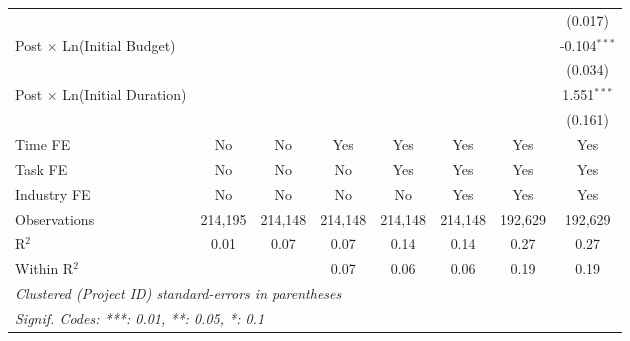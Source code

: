 \documentclass[
]{article}
\begin{document}
\begin{tabular}{lccccccc}
                                              &                &                &                &                &                &                & (0.017)\\   
   Post $\times$ Ln(Initial Budget)           &                &                &                &                &                &                & -0.104$^{***}$\\   
                                              &                &                &                &                &                &                & (0.034)\\   
   Post $\times$ Ln(Initial Duration)         &                &                &                &                &                &                & 1.551$^{***}$\\   
                                              &                &                &                &                &                &                & (0.161)\\   
   Time FE                                    & No             & No             & Yes            & Yes            & Yes            & Yes            & Yes\\  
   Task FE                                    & No             & No             & No             & Yes            & Yes            & Yes            & Yes\\  
   Industry FE                                & No             & No             & No             & No             & Yes            & Yes            & Yes\\  
   Observations                               & 214,195        & 214,148        & 214,148        & 214,148        & 214,148        & 192,629        & 192,629\\  
   R$^2$                                      & 0.01           & 0.07           & 0.07           & 0.14           & 0.14           & 0.27           & 0.27\\  
   Within R$^2$                               &                &                & 0.07           & 0.06           & 0.06           & 0.19           & 0.19\\  
   \midrule
   \multicolumn{8}{l}{\emph{Clustered (Project ID) standard-errors in parentheses}}\\
   \multicolumn{8}{l}{\emph{Signif. Codes: ***: 0.01, **: 0.05, *: 0.1}}\\
\end{tabular}
\par\endgroup
\end{document}
